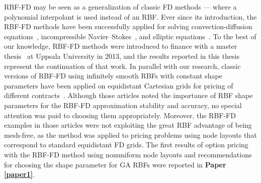\documentclass{UUThesisTemplate}
\begin{document}
\par
RBF-FD may be seen as a generalization of classic FD methods --- where a polynomial interpolant is used instead of an RBF. Ever since its introduction, the RBF-FD methods have been successfully applied for solving convection-diffusion equations~\cite{chandhini2007local, stevens2009use}, incompressible Navier--Stokes~\cite{shu2003local, shan2008application, chinchapatnam2009compact}, and elliptic equations~\cite{tolstykh2003using, wright2006scattered}. To the best of our knowledge, RBF-FD methods were introduced to finance with a master thesis~\cite{wang2013radial} at Uppsala University in 2013, and the results reported in this thesis represent the continuation of that work. In parallel with our research, classic versions of RBF-FD using infinitely smooth RBFs with constant shape parameters have been applied on equidistant Cartesian grids for pricing of different contracts~\cite{kadalbajoo2013application, kadalbajoo2015application, kumar2015numerical, kadalbajoo2017radial}. Although those articles noted the importance of RBF shape parameters for the RBF-FD approximation stability and accuracy, no special attention was paid to choosing them appropriately. Moreover, the RBF-FD examples in those articles were not exploiting the great RBF advantage of being mesh-free, as the method was applied to pricing problems using node layouts that correspond to standard equidistant FD grids. The first results of option pricing with the RBF-FD method using nonuniform node layouts and recommendations for choosing the shape parameter for GA RBFs were reported in \textbf{Paper \ref{paper1}}.
%
\end{document}
